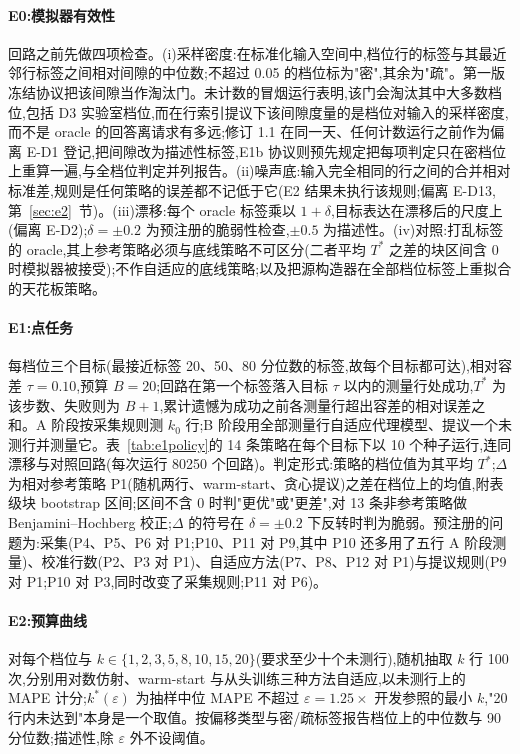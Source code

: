 \documentclass[11pt,a4paper]{ctexart}
\begin{document}
\paragraph{E0:模拟器有效性} 回路之前先做四项检查。(i)采样密度:在标准化输入空间中,档位行的标签与其最近邻行标签之间相对间隙的中位数;不超过 0.05 的档位标为"密",其余为"疏"。第一版冻结协议把该间隙当作淘汰门。未计数的冒烟运行表明,该门会淘汰其中大多数档位,包括 D3 实验室档位,而在行索引提议下该间隙度量的是档位对输入的采样密度,而不是 oracle 的回答离请求有多远;修订 1.1 在同一天、任何计数运行之前作为偏离 E-D1 登记,把间隙改为描述性标签,E1b 协议则预先规定把每项判定只在密档位上重算一遍,与全档位判定并列报告。(ii)噪声底:输入完全相同的行之间的合并相对标准差,规则是任何策略的误差都不记低于它(E2 结果未执行该规则;偏离 E-D13,第~\ref{sec:e2}~节)。(iii)漂移:每个 oracle 标签乘以 $1 + \delta$,目标表达在漂移后的尺度上(偏离 E-D2);$\delta = \pm 0.2$ 为预注册的脆弱性检查,$\pm 0.5$ 为描述性。(iv)对照:打乱标签的 oracle,其上参考策略必须与底线策略不可区分(二者平均 $T^{*}$ 之差的块区间含 0 时模拟器被接受);不作自适应的底线策略;以及把源构造器在全部档位标签上重拟合的天花板策略。

\paragraph{E1:点任务} 每档位三个目标(最接近标签 20、50、80 分位数的标签,故每个目标都可达),相对容差 $\tau = 0.10$,预算 $B = 20$;回路在第一个标签落入目标 $\tau$ 以内的测量行处成功,$T^{*}$ 为该步数、失败则为 $B + 1$,累计遗憾为成功之前各测量行超出容差的相对误差之和。A 阶段按采集规则测 $k_0$ 行;B 阶段用全部测量行自适应代理模型、提议一个未测行并测量它。表~\ref{tab:e1policy}的 14 条策略在每个目标下以 10 个种子运行,连同漂移与对照回路(每次运行 80250 个回路)。判定形式:策略的档位值为其平均 $T^{*}$;$\Delta$ 为相对参考策略 P1(随机两行、warm-start、贪心提议)之差在档位上的均值,附表级块 bootstrap 区间;区间不含 0 时判"更优"或"更差",对 13 条非参考策略做 Benjamini--Hochberg 校正;$\Delta$ 的符号在 $\delta = \pm 0.2$ 下反转时判为脆弱。预注册的问题为:采集(P4、P5、P6 对 P1;P10、P11 对 P9,其中 P10 还多用了五行 A 阶段测量)、校准行数(P2、P3 对 P1)、自适应方法(P7、P8、P12 对 P1)与提议规则(P9 对 P1;P10 对 P3,同时改变了采集规则;P11 对 P6)。

\paragraph{E2:预算曲线} 对每个档位与 $k \in \{1, 2, 3, 5, 8, 10, 15, 20\}$(要求至少十个未测行),随机抽取 $k$ 行 100 次,分别用对数仿射、warm-start 与从头训练三种方法自适应,以未测行上的 MAPE 计分;$k^{*}(\varepsilon)$ 为抽样中位 MAPE 不超过 $\varepsilon = 1.25 \times$ 开发参照的最小 $k$,"20 行内未达到"本身是一个取值。按偏移类型与密/疏标签报告档位上的中位数与 90 分位数;描述性,除 $\varepsilon$ 外不设阈值。
\end{document}
